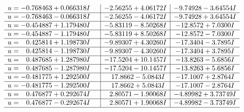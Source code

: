 \documentclass[1p]{elsarticle_modified}
\theoremstyle{definition}
\begin{document}
$$\begin{array}{c|c|c}
\begin{aligned}
u &= -0.768463 + 0.066318 I\end{aligned}
 & -2.56255 + 4.06172 I & -9.74928 - 3.64554 I \\ \hline\begin{aligned}
u &= -0.768463 - 0.066318 I\end{aligned}
 & -2.56255 - 4.06172 I & -9.74928 + 3.64554 I \\ \hline\begin{aligned}
u &= -0.454887 + 1.179480 I\end{aligned}
 & -5.83119 - 8.50268 I & -12.8572 + 7.0300 I \\ \hline\begin{aligned}
u &= -0.454887 - 1.179480 I\end{aligned}
 & -5.83119 + 8.50268 I & -12.8572 - 7.0300 I \\ \hline\begin{aligned}
u &= \phantom{-}0.425814 + 1.198730 I\end{aligned}
 & -9.89307 + 4.30260 I & -17.3404 - 3.7895 I \\ \hline\begin{aligned}
u &= \phantom{-}0.425814 - 1.198730 I\end{aligned}
 & -9.89307 - 4.30260 I & -17.3404 + 3.7895 I \\ \hline\begin{aligned}
u &= \phantom{-}0.487685 + 1.287980 I\end{aligned}
 & -17.5204 + 10.1457 I & -13.8263 - 5.6856 I \\ \hline\begin{aligned}
u &= \phantom{-}0.487685 - 1.287980 I\end{aligned}
 & -17.5204 - 10.1457 I & -13.8263 + 5.6856 I \\ \hline\begin{aligned}
u &= -0.481775 + 1.292500 I\end{aligned}
 & \phantom{-}17.8662 - 5.0843 I & -17.1007 + 2.8764 I \\ \hline\begin{aligned}
u &= -0.481775 - 1.292500 I\end{aligned}
 & \phantom{-}17.8662 + 5.0843 I & -17.1007 - 2.8764 I \\ \hline\begin{aligned}
u &= \phantom{-}0.476877 + 0.292674 I\end{aligned}
 & \phantom{-}2.80571 - 1.90068 I & -4.89982 + 3.73749 I \\ \hline\begin{aligned}
u &= \phantom{-}0.476877 - 0.292674 I\end{aligned}
 & \phantom{-}2.80571 + 1.90068 I & -4.89982 - 3.73749 I\\
 \hline 
 \end{array}$$\newpage\newpage\renewcommand{\arraystretch}{1}
\end{document}
